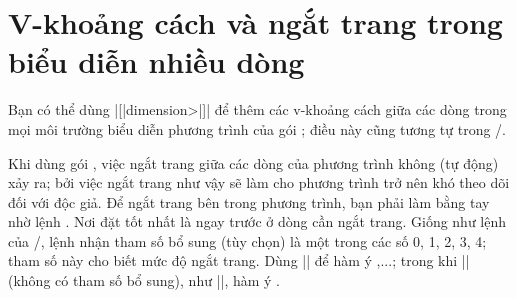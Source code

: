 \documentclass[11pt,leqno,titlepage,openany,oneside]{amsldoc}[1999/12/13]
\newcommand{\ii}[1]{#1\index{#1}}
\begin{document}
\section{V-khoảng cách và ngắt trang trong biểu diễn nhiều dòng}

Bạn có thể dùng \cn{\\}|[|\<dimension>|]| để thêm các v-khoảng cách giữa
các dòng trong mọi môi trường biểu diễn phương trình của gói ;
điều này cũng tương tự trong \latex/.


\medskip
Khi dùng gói , việc \ii{ngắt trang} giữa các dòng của phương trình
không (tự động) xảy ra; bởi việc ngắt trang như vậy sẽ làm cho phương trình trở nên
khó theo dõi đối với độc giả.
Để ngắt trang bên trong phương trình, bạn phải làm bằng tay nhờ lệnh
.
Nơi đặt  tốt nhất là ngay trước \cn{\\} ở dòng cần ngắt trang.
Giống như lệnh  của \latex/, lệnh  nhận
tham số bổ sung (tùy chọn) là một trong các số 0, 1, 2, 3, 4;
tham số này cho biết mức độ ngắt trang. Dùng |\displaybreak[0]| để hàm ý
,...; trong khi |\displaybreak|
(không có tham số bổ sung), như |\displaybreak[4]|, hàm ý
.
\end{document}

